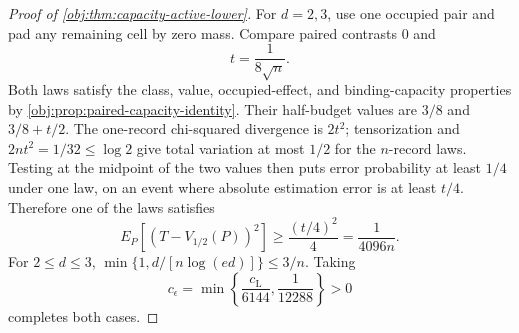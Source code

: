 \documentclass[11pt]{article}
\begin{document}
\begin{proof}[Proof of \cref{obj:thm:capacity-active-lower}]
For \(d=2,3\), use one occupied pair and pad any remaining cell by zero mass. Compare paired contrasts \(0\) and
\[
t=\frac1{8\sqrt n}.
\] %
Both laws satisfy the class, value, occupied-effect, and binding-capacity properties by \cref{obj:prop:paired-capacity-identity}. Their half-budget values are \(3/8\) and \(3/8+t/2\). The one-record chi-squared divergence is \(2t^2\); tensorization and \(2nt^2=1/32\le\log2\) give total variation at most \(1/2\) for the \(n\)-record laws. Testing at the midpoint of the two values then puts error probability at least \(1/4\) under one law, on an event where absolute estimation error is at least \(t/4\). Therefore one of the laws satisfies
\[
E_P\!\left[(T-V_{1/2}(P))^2\right]
\ge\frac{(t/4)^2}{4}
=\frac1{4096n}.
\] %
For \(2\le d\le3\), \(\min\{1,d/[n\log(ed)]\}\le3/n\). Taking
\[
c_\epsilon=\min\left\{\frac{c_{\mathrm L}}{6144},
                         \frac1{12288}\right\}>0
\] %
completes both cases. %
\end{proof}
\end{document}
